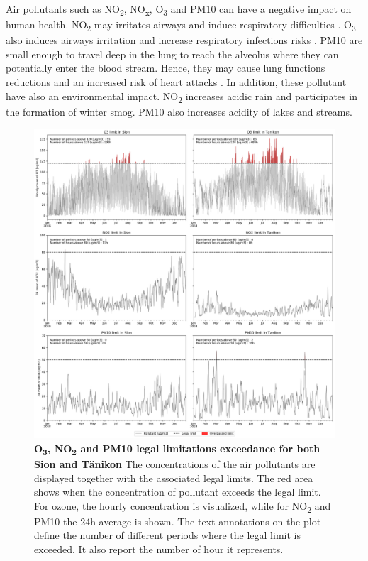 \documentclass[a4paper, 12pt]{article}
\begin{document}
    Air pollutants such as NO\textsubscript{2}, NO\textsubscript{x}, O\textsubscript{3} and PM10 can have a negative impact on human health. NO\textsubscript{2} may irritates airways and induce respiratory difficulties \cite{NO2Health}. O\textsubscript{3} also induces airways irritation and increase respiratory infections risks \cite{OzoneHealth}. PM10 are small enough to travel deep in the lung to reach the alveolus where they can potentially enter the blood stream. Hence, they may cause lung functions reductions and an increased risk of heart attacks \cite{PM10Health}. In addition, these pollutant have also an environmental impact. NO\textsubscript{2} increases acidic rain and participates in the formation of winter smog. PM10 also increases acidity of lakes and streams. 
    \\
    \begin{figure}[!t]
        \centering
        \includegraphics[width = 1 \textwidth]{Figures/limit.png}
        \caption{\textbf{O\textsubscript{3}, NO\textsubscript{2} and PM10 legal limitations exceedance for both Sion and Tänikon} The concentrations of the air pollutants are displayed together with the associated legal limits. The red area shows when the concentration of pollutant exceeds the legal limit. For ozone, the hourly concentration is visualized, while for NO\textsubscript{2} and PM10 the 24h average is shown. The text annotations on the plot define the number of different periods where the legal limit is exceeded. It also report the number of hour it represents.}
        \label{legal_limit}
    \end{figure}
\end{document}
